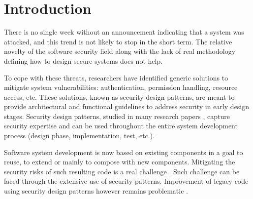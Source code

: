 \section{Introduction}

There is no single week without an announcement indicating that a system was attacked, and this trend is not likely to stop in the short term. The relative novelty of the software security field along with the lack of real methodology defining how to design secure systems does not help.

To cope with these threats, researchers have identified generic solutions to mitigate system vulnerabilities: authentication, permission handling, resource access, etc. These solutions, known as security design patterns, are meant to provide architectural and functional guidelines to address security in early design stages. Security design patterns, studied in many research papers  \cite{fernandez2013, yoshioka2008, washizaki2018taxonomy}, capture security expertise and can be used throughout the entire system development process (design phase, implementation, test, etc.).


Software system development is now based on existing components in a goal to reuse, to extend or mainly to compose with new components. Mitigating the security risks of such resulting code is a real challenge \cite{souag2016reusable}. Such challenge can be faced through the extensive use of security patterns. Improvement of legacy code using security design patterns however remains problematic \cite{washizaki2018taxonomy}.

